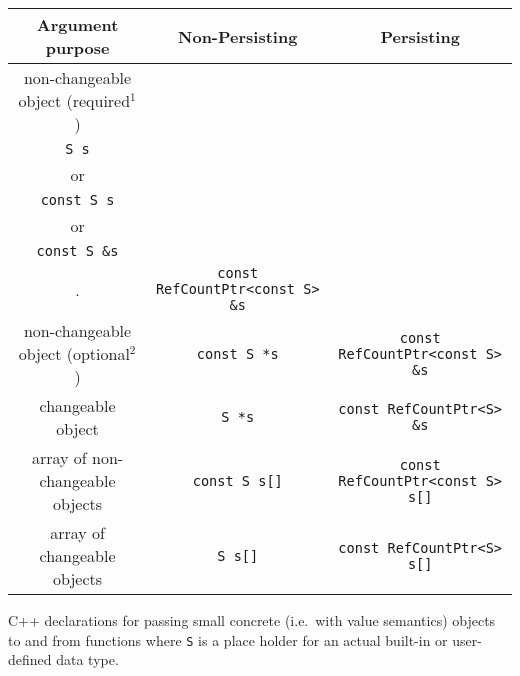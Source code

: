 \documentclass[pdf,ps2pdf,11pt]{SANDreport}
\begin{document}
%
\begin{center}
\begin{minipage}{{}\textwidth}
\begin{tabular}{|c|c|c|}
\hline
Argument purpose
& Non-Persisting
& Persisting \\
\hline
\hline
non-changeable object (required$^1$)
& \begin{minipage}{12ex}
    \begin{center}
    {\tiny .}\\
    {}\texttt{S s} \\
    or \\
    {}\texttt{const S s} \\
    or \\
    {}\texttt{const S \&s} \\
    {\tiny .}
    \end{center}
  \end{minipage}
& {}\texttt{const RefCountPtr<const S> \&s} \\
\hline
non-changeable object (optional$^2$)
& {}\texttt{const S *s}
& {}\texttt{const RefCountPtr<const S> \&s} \\
\hline
changeable object
& {}\texttt{S *s}
& {}\texttt{const RefCountPtr<S> \&s} \\
\hline
array of non-changeable objects
& {}\texttt{const S s[]}
& {}\texttt{const RefCountPtr<const S> s[]} \\
\hline
array of changeable objects
& {}\texttt{S s[]}
& {}\texttt{const RefCountPtr<S> s[]} \\
\hline
\end{tabular}
\begin{center}
C++ declarations for passing small concrete (i.e.~with value
semantics) objects to and from functions where {}\texttt{S} is a place
holder for an actual built-in or user-defined data type.
\end{center}
\end{minipage}
\end{center}
%
%
\end{document}
